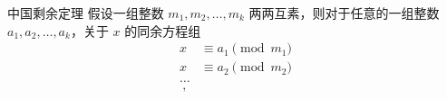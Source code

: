 
\begin{theorem}{中国剩余定理}
假设一组整数 $m_1, m_2, \dots, m_k$ 两两互素，则对于任意的一组整数 $a_1, a_2, \dots, a_k$，关于 $x$ 的同余方程组
\begin{equation}
\begin{aligned}
x &\equiv a_1 \pmod{m_1} \\
x &\equiv a_2 \pmod{m_2} \\
\dots   \\
~,
\end{aligned}
\end{equation}

\end{theorem}